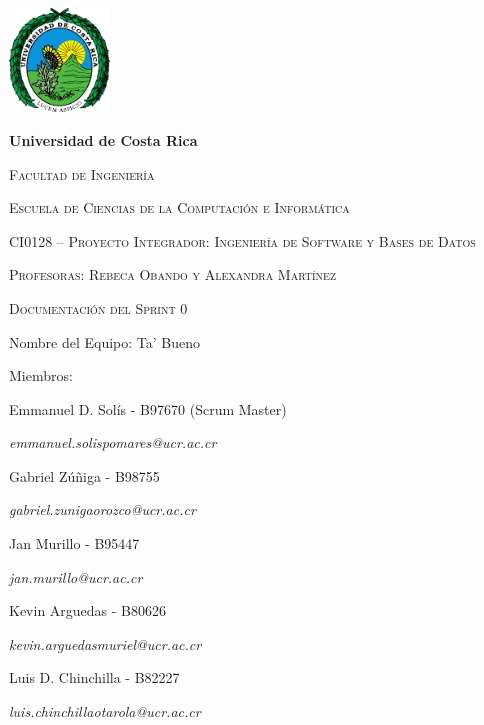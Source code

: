\documentclass{article}
\begin{document}
\begin{titlepage}
\centering
{\includegraphics[width=0.2\textwidth]{logoUCR.png}\par}
\vspace{1cm}
{\bfseries\LARGE Universidad de Costa Rica \par}
\vspace{1cm}
{\scshape\Large Facultad de Ingenier\'ia \par}
{\scshape\Large Escuela de Ciencias de la Computaci\'on e Inform\'atica \par}
\vspace{1cm}
{\scshape\Large CI0128 – Proyecto Integrador: Ingeniería de Software y Bases de Datos \par}
{\scshape\Large Profesoras: Rebeca Obando y Alexandra Martínez \par}
\vspace{1cm}
{\scshape\Huge Documentación del Sprint 0 \par}
\vspace{1cm}
{\Large Nombre del Equipo: Ta' Bueno \par}
\vspace{0.5cm}
{\Large Miembros: \par}
{\Large Emmanuel D. Sol\'is - B97670 (Scrum Master)\par}
{\Large \textit{\color{blue}emmanuel.solispomares@ucr.ac.cr} \par}
{\Large Gabriel Zúñiga - B98755\par}
{\Large \textit{\color{blue}gabriel.zunigaorozco@ucr.ac.cr} \par}
{\Large Jan Murillo - B95447\par}
{\Large \textit{\color{blue}jan.murillo@ucr.ac.cr} \par}
{\Large Kevin Arguedas - B80626\par}
{\Large \textit{\color{blue}kevin.arguedasmuriel@ucr.ac.cr} \par}
{\Large Luis D. Chinchilla - B82227\par}
{\Large \textit{\color{blue}luis.chinchillaotarola@ucr.ac.cr} \par}
\end{titlepage}

\newpage
\tableofcontents
\end{document}
